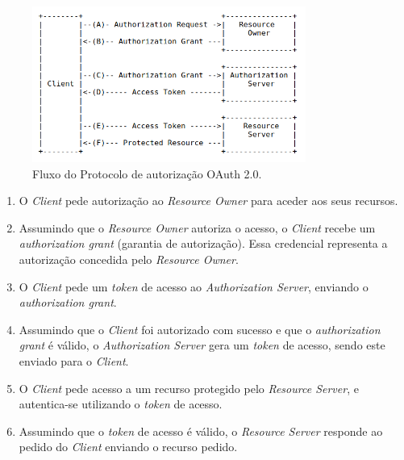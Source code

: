 \begin{figure}[H]
  \centering
  \includegraphics[width=0.8\textwidth]{imgs/oauth2flow.png}
  \caption[Fluxo do Protocolo 2.0]{Fluxo do Protocolo de autorização OAuth 2.0. \cite{oauth20}}
  \label{f:oauth2flow}
\end{figure}

\begin{enumerate}[label=(\Alph*)]
    \item O \textit{Client} pede autorização ao \textit{Resource Owner} para aceder aos seus recursos.
    \item Assumindo que o \textit{Resource Owner} autoriza o acesso, o \textit{Client} recebe um \textit{authorization grant} (garantia de autorização). Essa credencial representa a autorização concedida pelo \textit{Resource Owner}.
    \item O \textit{Client} pede um \textit{token} de acesso ao \textit{Authorization Server}, enviando o \textit{authorization grant}.
    \item Assumindo que o \textit{Client} foi autorizado com sucesso e que o \textit{authorization grant} é válido, o \textit{Authorization Server} gera um \textit{token} de acesso, sendo este enviado para o \textit{Client}.
    \item O \textit{Client} pede acesso a um recurso protegido pelo \textit{Resource Server}, e autentica-se utilizando o \textit{token} de acesso.
    \item Assumindo que o \textit{token} de acesso é válido, o \textit{Resource Server} responde ao pedido do \textit{Client} enviando o recurso pedido.
\end{enumerate}


